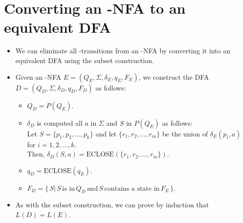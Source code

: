 \documentclass[]{article}
\begin{document}
\section{Converting an \textepsilon-NFA to an equivalent DFA}
  \begin{itemize}
    \item We can eliminate all \textepsilon-transitions from an \textepsilon-NFA
    by converting it into an equivalent DFA using the subset construction.
    \item Given an \textepsilon-NFA $E = (Q_E, \Sigma, \delta_E, q_E, F_E)$, we
    construct the DFA $D = (Q_D, \Sigma, \delta_D, q_D, F_D)$ as follows:
      \begin{itemize}
        \item $Q_D = P(Q_E)$.
        \item $\delta_D$ is computed all $a$ in $\Sigma$ and $S$ in $P(Q_E)$ as
        follows: \\ Let $S = \{p_1, p_2, \ldots, p_k\}$ and let
        $\{r_1,r_2,\ldots,r_m\}$ be the union of $\delta_E(p_i, a)$ for $i = 1,
        2, \ldots, k$. \\ Then, $\delta_D(S,a) =
        \text{ECLOSE}(\{r_1,r_2,\ldots,r_m\})$.
        \item $q_D = \text{ECLOSE}(q_E)$.
        \item $F_D = \{ \, S | \, S \, \text{is in} \, Q_D \, \text{and} \, S \,
        \text{contains a state in} \, F_E \, \}$.
      \end{itemize}
    \item As with the subset construction, we can prove by induction that
    $L(D) = L(E)$.
  \end{itemize}
\end{document}

